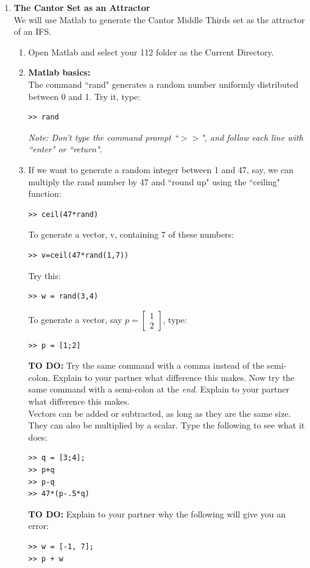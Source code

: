 \documentclass[12pt]{article}
\begin{document}
\begin{enumerate}
\item {\bf The Cantor  Set as an Attractor}
\\ We will use Matlab to generate the Cantor Middle Thirds set as the attractor of an IFS.
\begin{enumerate}
\item Open Matlab and select your 112 folder as the Current Directory.
\item {\bf Matlab basics:}\\
The command ``rand" generates a random number uniformly distributed between 0 and 1.  Try it, type:
\begin{verbatim}
>> rand
\end{verbatim}
{\it Note: Don't type the command prompt ``$>>$", and follow each line with ``enter" or ``return".}
\item If we want to generate a random integer between 1 and 47, say, we can multiply the rand number
by 47 and ``round up" using the ``ceiling" function:
\begin{verbatim}
>> ceil(47*rand)
\end{verbatim}
To generate a vector, v,  containing 7 of these numbers:
\begin{verbatim}
>> v=ceil(47*rand(1,7))
\end{verbatim}
Try this:
\begin{verbatim}
>> w = rand(3,4)
\end{verbatim}
To generate a vector, say $p = \left[\begin{array}{c}1 \\2\end{array}\right]$, type:
\begin{verbatim}
>> p = [1;2]
\end{verbatim}
{\bf TO DO:}  Try the same command with a comma instead of the semi-colon.  Explain to your partner what difference this makes.  Now try the same command with a semi-colon at the {\it end}.  Explain to your partner what difference this makes.\\
Vectors can be added or subtracted, as long as they are the same size.  They can also be multiplied by a scalar.  Type the following to see what it does:
\begin{verbatim}
>> q = [3;4];
>> p+q
>> p-q
>> 47*(p-.5*q)
\end{verbatim}
{\bf TO DO:} Explain to your partner why the following will give you an error:
\begin{verbatim}
>> w = [-1, 7];
>> p + w
\end{verbatim}

\end{enumerate}
\end{enumerate}
\end{document}
